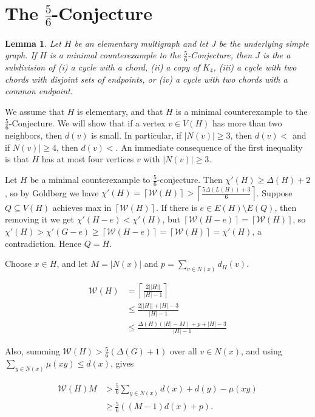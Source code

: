 \documentclass[12pt]{amsart}
\theoremstyle{plain}
\newtheorem{lem}[thm]{Lemma}
\theoremstyle{definition}
\theoremstyle{remark}
\newcommand{\fancy}[1]{\mathcal{#1}}
\newcommand{\W}{\fancy{W}}
\newcommand{\ceil}[1]{\left\lceil#1\right\rceil}
\begin{document}
\section{The $\frac56$-Conjecture}
\label{sec:56}
\begin{lem}
\label{56helper}
Let $H$ be an elementary multigraph and let $J$ be the underlying simple graph.
If $H$ is a minimal counterexample to the $\frac56$-Conjecture, then
$J$ is the a subdivision of (i) a cycle with a chord, 
(ii) a copy of $K_4$,
(iii) a cycle with two
chords with disjoint sets of endpoints, or 
(iv) a cycle with two chords with a common endpoint.
\end{lem}
We assume that $H$ is elementary, and that $H$ is a minimal counterexample to
the $\frac56$-Conjecture.  We will show that if a vertex $v\in V(H)$ has more
than two neighbors, then $d(v)$ is small.  In particular, if $|N(v)|\ge 3$, then
$d(v)<$ and if $N(v)|\ge 4$, then $d(v)<$.  An immediate consequence of the
first inequality is that $H$ has at most four vertices $v$ with $|N(v)|\ge 3$.
%

Let $H$ be a minimal counterexample to $\frac56$-conjecture. Then $\chi'(H) \ge
\Delta(H) + 2$, so by Goldberg we have $\chi'(H) = \ceil{\W(H)} >
\ceil{\frac{5\Delta(L(H)) + 3}6}$.  Suppose $Q \subseteq V(H)$ achieves max in
$\ceil{\W(H)}$.  If there is $e \in E(H) \setminus E(Q)$, then removing it we get
$\chi'(H-e) < \chi'(H)$, but $\ceil{\W(H-e)} = \ceil{\W(H)}$, so  $\chi'(H) >
\chi'(G-e) \ge \ceil{\W(H-e)} =  \ceil{\W(H)} = \chi'(H)$, a contradiction. Hence $Q
= H$.

Choose $x \in H$, and let $M = |N(x)|$ and $p = \sum_{v \in N(x)} d_H(v)$.

\begin{align}
\W(H) & = \ceil{\frac{2||H||}{|H| - 1}} \\
& \le \frac{2||H|| + |H| - 3}{|H|-1}  \nonumber \\
& \le \frac{\Delta(H)(|H| - M) + p + |H| - 3}{|H|-1} \nonumber
\end{align}

Also, summing $\W(H) > \frac56(\Delta(G) + 1)$ over all $v \in N(x)$, and using
$\sum_{y\in N(x)}\mu(xy)\le d(x)$, gives

\begin{align}
\W(H)M & >  \frac56\sum_{y\in N(x)}d(x)+d(y)-\mu(xy) \nonumber \\
& \ge \frac56((M-1)d(x) + p).
\end{align}
\end{document}
